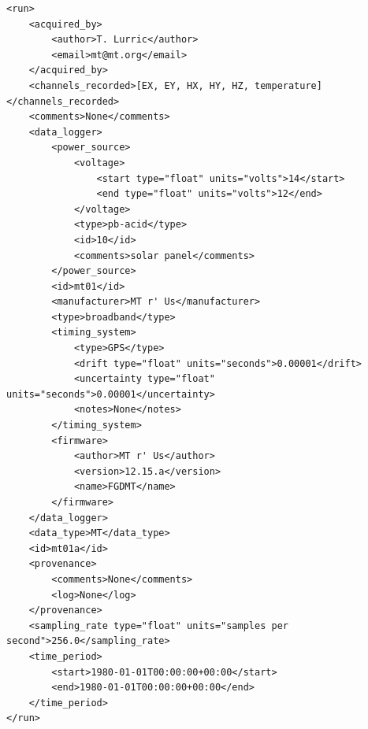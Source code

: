 \documentclass{article}
\begin{document}
\begin{verbatim}
<run>
    <acquired_by>
        <author>T. Lurric</author>
        <email>mt@mt.org</email>
    </acquired_by>
    <channels_recorded>[EX, EY, HX, HY, HZ, temperature]</channels_recorded>
    <comments>None</comments>
    <data_logger>
        <power_source>
            <voltage>
                <start type="float" units="volts">14</start>
                <end type="float" units="volts">12</end>
            </voltage>
            <type>pb-acid</type>
            <id>10</id>
            <comments>solar panel</comments>
        </power_source>
        <id>mt01</id>
        <manufacturer>MT r' Us</manufacturer>
        <type>broadband</type>
        <timing_system>
            <type>GPS</type>
            <drift type="float" units="seconds">0.00001</drift>
            <uncertainty type="float" units="seconds">0.00001</uncertainty>
            <notes>None</notes>
        </timing_system>
        <firmware>
            <author>MT r' Us</author>
            <version>12.15.a</version>
            <name>FGDMT</name>
        </firmware>
    </data_logger>
    <data_type>MT</data_type>
    <id>mt01a</id>
    <provenance>
        <comments>None</comments>
        <log>None</log>
    </provenance>
    <sampling_rate type="float" units="samples per second">256.0</sampling_rate>
    <time_period>
        <start>1980-01-01T00:00:00+00:00</start>
        <end>1980-01-01T00:00:00+00:00</end>
    </time_period>
</run>
\end{verbatim}
\end{document}
